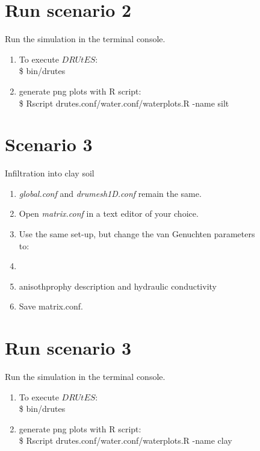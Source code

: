 \documentclass[
10pt, %
a4paper, %
oneside, %
headinclude,footinclude, %
BCOR5mm, %
]{scrartcl}
\begin{document}
\begin{figure}[!h]
\section*{Run scenario 2}
Run the simulation in the terminal console.
\begin{enumerate}
\item To execute $DRUtES$: \\
\$ bin/drutes
\item generate png plots with R script: \\
\$ Rscript drutes.conf/water.conf/waterplots.R -name silt
\end{enumerate}

\section*{Scenario 3}
Infiltration into clay soil
\begin{enumerate}
\item \emph{global.conf} and \emph{drumesh1D.conf} remain the same.
\item Open \emph{matrix.conf} in a text editor of your choice. 
\item Use the same set-up, but change the van Genuchten parameters to:
\item {}
\item anisothprophy description and hydraulic conductivity\\ 
\item Save matrix.conf.
\end{enumerate}

\section*{Run scenario 3}
Run the simulation in the terminal console.
\begin{enumerate}
\item To execute $DRUtES$: \\
\$ bin/drutes
\item generate png plots with R script: \\
\$ Rscript drutes.conf/water.conf/waterplots.R -name clay
\end{enumerate}


\end{figure}
\end{document}
